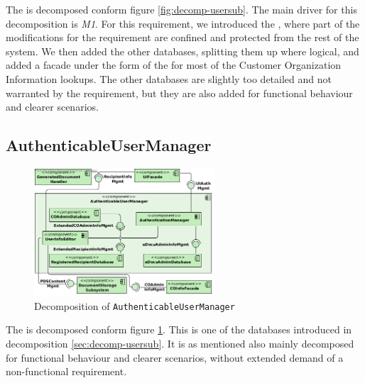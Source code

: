The  is decomposed conform figure \ref{fig:decomp-usersub}. The main driver for this decomposition is \emph{M1}. For this requirement, we introduced the , where part of the modifications for the requirement are confined and protected from the rest of the system. We then added the other databases, splitting them up where logical, and added a facade under the form of the  for most of the Customer Organization Information lookups. The other databases are slightly too detailed and not warranted by the requirement, but they are also added for functional behaviour and clearer scenarios.

\subsection{AuthenticableUserManager}
\begin{figure}[!htp]
    \centering
    \includegraphics[width=0.6\textwidth]{figures/AuthenticableUserManager.png}
    \caption{Decomposition of \texttt{AuthenticableUserManager}}\label{fig:decomp-authuserman}
\end{figure}

The  is decomposed conform figure \ref{fig:decomp-authuserman}. This is one of the databases introduced in decomposition \ref{sec:decomp-usersub}. It is as mentioned also mainly decomposed for functional behaviour and clearer scenarios, without extended demand of a non-functional requirement.

